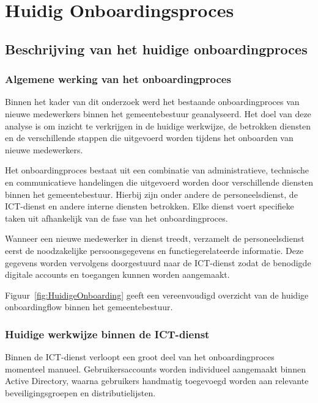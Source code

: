 
\chapter{Huidig Onboardingsproces}
\label{ch:Huidig-Onboardingsproces}

\section{Beschrijving van het huidige onboardingproces}

\subsection{Algemene werking van het onboardingproces}

Binnen het kader van dit onderzoek werd het bestaande onboardingproces van nieuwe medewerkers binnen het gemeentebestuur geanalyseerd. Het doel van deze analyse is om inzicht te verkrijgen in de huidige werkwijze, de betrokken diensten en de verschillende stappen die uitgevoerd worden tijdens het onboarden van nieuwe medewerkers.

Het onboardingproces bestaat uit een combinatie van administratieve, technische en communicatieve handelingen die uitgevoerd worden door verschillende diensten binnen het gemeentebestuur. Hierbij zijn onder andere de personeelsdienst, de ICT-dienst en andere interne diensten betrokken. Elke dienst voert specifieke taken uit afhankelijk van de fase van het onboardingproces.

Wanneer een nieuwe medewerker in dienst treedt, verzamelt de personeelsdienst eerst de noodzakelijke persoonsgegevens en functiegerelateerde informatie. Deze gegevens worden vervolgens doorgestuurd naar de ICT-dienst zodat de benodigde digitale accounts en toegangen kunnen worden aangemaakt.

Figuur~\ref{fig:HuidigeOnboarding} geeft een vereenvoudigd overzicht van de huidige onboardingflow binnen het gemeentebestuur.

\subsection{Huidige werkwijze binnen de ICT-dienst}

Binnen de ICT-dienst verloopt een groot deel van het onboardingproces momenteel manueel. Gebruikersaccounts worden individueel aangemaakt binnen Active Directory, waarna gebruikers handmatig toegevoegd worden aan relevante beveiligingsgroepen en distributielijsten.

